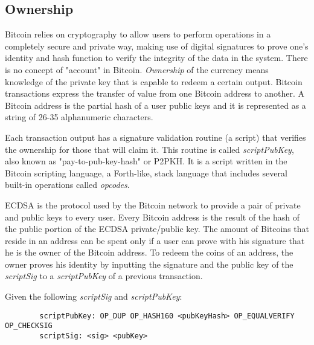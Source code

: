 		\newpage
		
		\subsection{Ownership}
		
		Bitcoin relies on cryptography to allow users to perform operations in a completely secure and private way, making use of digital signatures to prove one's identity and hash function to verify the integrity of the data in the system.
		There is no concept of "account" in Bitcoin. \textit{Ownership} of the currency means knowledge of the private key that is capable to redeem a certain output. 	Bitcoin transactions express the transfer of value from one Bitcoin address to another. A Bitcoin address is the partial hash of a user public keys and it is represented as a string of 26-35 alphanumeric characters.
		
		Each transaction output has a signature validation routine (a script) that verifies the ownership for those that will claim it. This routine is called \textit{scriptPubKey}, also known as "pay-to-pub-key-hash" or P2PKH. It is a script written in the Bitcoin scripting language, a Forth-like, stack language that includes several built-in operations called \textit{opcodes}. 
		
		ECDSA is the protocol used by the Bitcoin network to provide a pair of private and public keys to every user. Every Bitcoin address is the result of the hash of the public portion of the ECDSA private/public key. The amount of Bitcoins that reside in an address can be spent only if a user can prove with his signature that he is the owner of the Bitcoin address. To redeem the coins of an address, the owner proves his identity by inputting the signature and the public key of the \textit{scriptSig} to a \textit{scriptPubKey} of a previous transaction.
		
		Given the following \textit{scriptSig} and \textit{scriptPubKey}:
		
		\begin{verbatim}
		scriptPubKey: OP_DUP OP_HASH160 <pubKeyHash> OP_EQUALVERIFY OP_CHECKSIG
		scriptSig: <sig> <pubKey>
		\end{verbatim}
		
